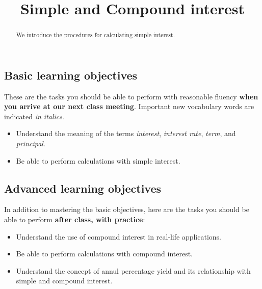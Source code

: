\documentclass{ximera}
\title{Simple and Compound interest}
\begin{document}
\begin{abstract}
We introduce the procedures for calculating simple interest.
\end{abstract}
\maketitle

\subsection*{Basic learning objectives}

These are the tasks you should be able to perform with reasonable fluency \textbf{when you arrive at our next class meeting}. Important new vocabulary words are indicated \emph{in italics}. 

\begin{itemize}
	\item Understand the meaning of the terms \emph{interest}, \emph{interest rate}, \emph{term}, and \emph{principal}.
    \item Be able to perform calculations with simple interest.
\end{itemize}

\subsection*{Advanced learning objectives}

In addition to mastering the basic objectives, here are the tasks you should be able to perform \textbf{after class, with practice}: 

\begin{itemize}
	\item Understand the use of compound interest in real-life applications.
	\item Be able to perform calculations with compound interest.
    \item Understand the concept of annul percentage yield and its relationship with simple and compound interest.
\end{itemize}
\end{document}
